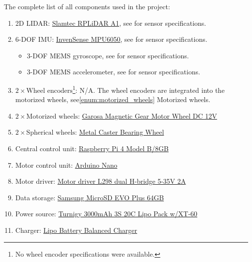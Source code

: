The complete list of all components used in the project:
\begin{enumerate}
    \item 2D LIDAR: \href{https://www.mouser.se/ProductDetail/426-DFR0315}{Slamtec RPLiDAR A1}, see\:\cite{slamtec_rplidar_2016} for sensor specifications.
    \item 6-DOF IMU: \href{https://www.mouser.se/ProductDetail/426-SEN0142}{InvenSense MPU6050}, see\:\cite{invensense_mpu-6000_2013} for sensor specifications.
    \begin{itemize}
        \item 3-DOF MEMS gyroscope, see\:\cite{invensense_mpu-6000_2013} for sensor specifications.
        \item 3-DOF MEMS accelerometer, see\:\cite{invensense_mpu-6000_2013} for sensor specifications.
    \end{itemize}
    \item $2 \times \text{Wheel encoders}$\footnote{No wheel encoder specifications were available.}: N/A. The wheel encoders are integrated into the motorized wheels, see\:\ref{enum:motorized_wheels} Motorized wheels.
    \item \label{enum:motorized_wheels} $2 \times \text{Motorized wheels}$: \href{https://www.amazon.se/dp/B07WP3XDLC?psc=1&ref=ppx_yo2ov_dt_b_product_details}{Garosa Magnetic Gear Motor Wheel DC 12V}
    \item $2 \times \text{Spherical wheels}$: \href{https://www.mouser.se/ProductDetail/485-3948}{Metal Caster Bearing Wheel}
    \item Central control unit: \href{https://www.electrokit.com/en/raspberry-pi-4-model-b/8gb}{Raspberry Pi 4 Model B/8GB}
    \item Motor control unit: \href{https://store.arduino.cc/products/arduino-nano}{Arduino Nano}
    \item Motor driver: \href{https://www.electrokit.com/en/motordrivare-l298-dubbel-h-brygga-5-35v-2a}{Motor driver L298 dual H-bridge 5-35V 2A}
    \item Data storage: \href{https://www.inet.se/produkt/5304540/samsung-microsd-evo-plus-64gb}{Samsung MicroSD EVO Plus 64GB}
    \item Power source: \href{https://hobbyking.com/en_us/turnigy-battery-3000mah-3s-20c-lipo-pack-xt-60.html?___store=en_us}{Turnigy 3000mAh 3S 20C Lipo Pack w/XT-60}
    \item Charger: \href{https://www.amazon.se/-/en/gp/product/B087G199LH/ref=ewc_pr_img_1?smid=ADG7ML0RBF414&psc=1}{Lipo Battery Balanced Charger}

\end{enumerate}
